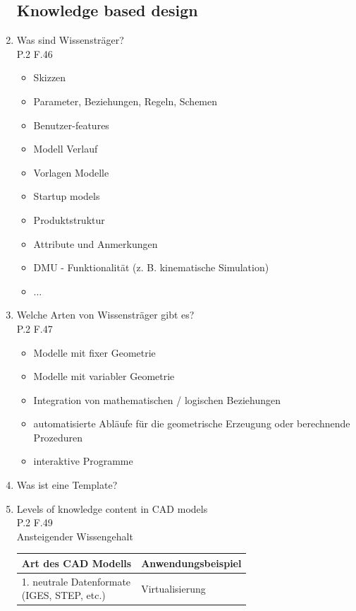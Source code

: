 \documentclass[10pt,a4paper,fleqn]{article}
\begin{document}
\begin{enumerate}
\subsection{Knowledge based design}
	\item Was sind Wissensträger?\\
		P.2 F.46
		\begin{itemize}
			\item Skizzen
			\item Parameter, Beziehungen, Regeln, Schemen
			\item Benutzer-features
			\item Modell Verlauf
			\item Vorlagen Modelle
			\item Startup models
			\item Produktstruktur
			\item Attribute und Anmerkungen
			\item DMU - Funktionalität (z. B. kinematische Simulation)
			\item $\dots$
		\end{itemize}
	\item Welche Arten von Wissensträger gibt es?\\
		P.2 F.47
		\begin{itemize}
			\item Modelle mit fixer Geometrie
			\item Modelle mit variabler Geometrie
			\item Integration von mathematischen / logischen Beziehungen
			\item automatisierte Abläufe für die geometrische Erzeugung oder berechnende Prozeduren
			\item interaktive Programme
		\end{itemize}
	\item Was ist eine Template?
	\item Levels of knowledge content in CAD models\\
		P.2 F.49\\
		Ansteigender Wissengehalt\\
		\begin{tabular}{l|l}
			Art des CAD Modells & Anwendungsbeispiel \\ 
			\hline 
			\pbox{20cm}{1. neutrale Datenformate \\ \mbox{}\hspace{0.4cm}(IGES, STEP, etc.)} & Virtualisierung \\ 

\end{tabular}
\end{enumerate}
\end{document}
